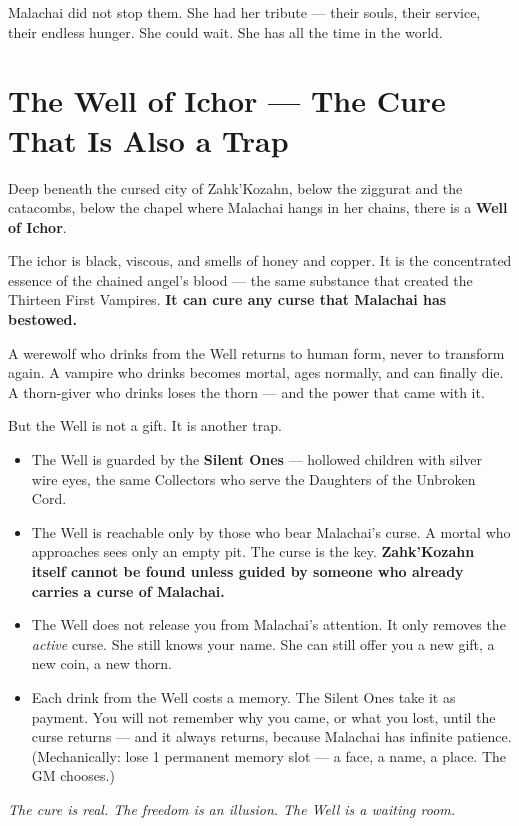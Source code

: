 \documentclass[10pt,twoside]{book}
\begin{document}
Malachai did not stop them. She had her tribute --- their souls, their service, their endless hunger. She could wait. She has all the time in the world.

\section{The Well of Ichor --- The Cure That Is Also a Trap}

Deep beneath the cursed city of Zahk'Kozahn, below the ziggurat and the catacombs, below the chapel where Malachai hangs in her chains, there is a \textbf{Well of Ichor}.

The ichor is black, viscous, and smells of honey and copper. It is the concentrated essence of the chained angel's blood --- the same substance that created the Thirteen First Vampires. \textbf{It can cure any curse that Malachai has bestowed.}

A werewolf who drinks from the Well returns to human form, never to transform again. A vampire who drinks becomes mortal, ages normally, and can finally die. A thorn-giver who drinks loses the thorn --- and the power that came with it.

But the Well is not a gift. It is another trap.

\begin{itemize}
\item The Well is guarded by the \textbf{Silent Ones} --- hollowed children with silver wire eyes, the same Collectors who serve the Daughters of the Unbroken Cord.
\item The Well is reachable only by those who bear Malachai's curse. A mortal who approaches sees only an empty pit. The curse is the key. \textbf{Zahk'Kozahn itself cannot be found unless guided by someone who already carries a curse of Malachai.}
\item The Well does not release you from Malachai's attention. It only removes the \textit{active} curse. She still knows your name. She can still offer you a new gift, a new coin, a new thorn.
\item Each drink from the Well costs a memory. The Silent Ones take it as payment. You will not remember why you came, or what you lost, until the curse returns --- and it always returns, because Malachai has infinite patience. (Mechanically: lose 1 permanent memory slot --- a face, a name, a place. The GM chooses.)
\end{itemize}

\textit{The cure is real. The freedom is an illusion. The Well is a waiting room.}
\end{document}
